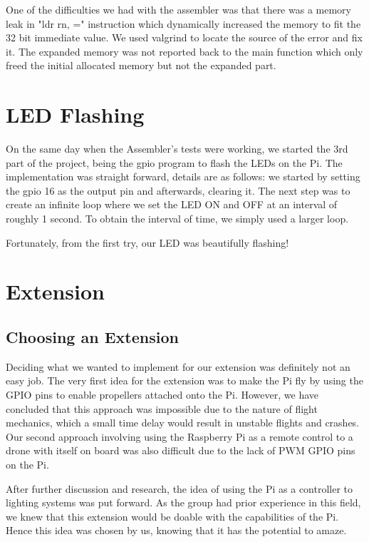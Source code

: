 \documentclass[11pt,a4paper]{article}
\begin{document}
One of the difficulties we had with the assembler was that there was a memory leak in "ldr rn, =" instruction which dynamically increased the memory to fit the 32 bit immediate value. We used valgrind to locate the source of the error and fix it. The expanded memory was not reported back to the main function which only freed the initial allocated memory but not the expanded part.

\section{LED Flashing}
On the same day when the Assembler’s tests were working, we started the 3rd part of the project, being the gpio program to flash the LEDs on the Pi. The implementation was straight forward, details are as follows: we started by setting the gpio 16 as the output pin and afterwards, clearing it. The next step was to create an infinite loop where we set the LED ON and OFF at an interval of roughly 1 second. To obtain the interval of time, we simply used a larger loop.

Fortunately, from the first try, our LED was beautifully flashing!

\newpage
\section{Extension}

\subsection{Choosing an Extension}
Deciding what we wanted to implement for our extension was definitely not an easy job. The very first idea for the extension was to make the Pi fly by using the GPIO pins to enable propellers attached onto the Pi. However, we have concluded that this approach was impossible due to the nature of flight mechanics, which a small time delay would result in unstable flights and crashes. Our second approach involving using the Raspberry Pi as a remote control to a drone with itself on board was also difficult due to the lack of PWM GPIO pins on the Pi.

After further discussion and research, the idea of using the Pi as a controller to lighting systems was put forward. As the group had prior experience in this field, we knew that this extension would be doable with the capabilities of the Pi. Hence this idea was chosen by us, knowing that it has the potential to amaze.
\end{document}
